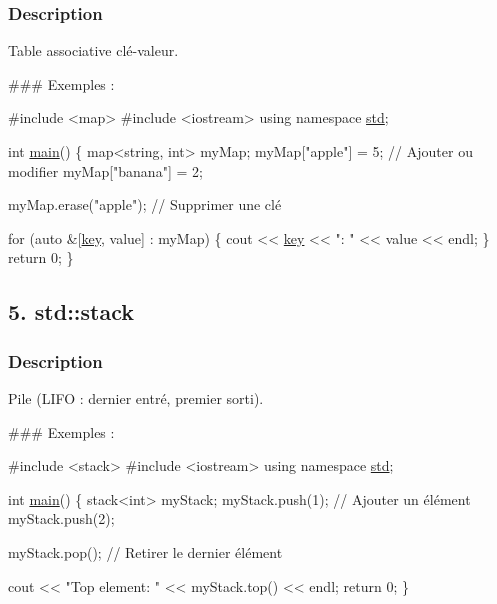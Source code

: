 \subsubsection*{Description}

Table associative clé-\/valeur.

\#\#\# Exemples \+: 
\begin{DoxyCode}
\textcolor{preprocessor}{#include <map>}
\textcolor{preprocessor}{#include <iostream>}
\textcolor{keyword}{using namespace }\hyperlink{namespacestd}{std};

\textcolor{keywordtype}{int} \hyperlink{htop_8c_a3c04138a5bfe5d72780bb7e82a18e627}{main}() \{
    map<string, int> myMap;
    myMap[\textcolor{stringliteral}{"apple"}] = 5; \textcolor{comment}{// Ajouter ou modifier}
    myMap[\textcolor{stringliteral}{"banana"}] = 2;

    myMap.erase(\textcolor{stringliteral}{"apple"}); \textcolor{comment}{// Supprimer une clé}

    \textcolor{keywordflow}{for} (\textcolor{keyword}{auto} &[\hyperlink{Action_8c_acd3d88da3c0e0313c3645ff34f62f542}{key}, value] : myMap) \{
        cout << \hyperlink{Action_8c_acd3d88da3c0e0313c3645ff34f62f542}{key} << \textcolor{stringliteral}{": "} << value << endl;
    \}
    \textcolor{keywordflow}{return} 0;
\}
\end{DoxyCode}




\subsection*{5. std\+::stack}

\subsubsection*{Description}

Pile (L\+I\+FO \+: dernier entré, premier sorti).

\#\#\# Exemples \+: 
\begin{DoxyCode}
\textcolor{preprocessor}{#include <stack>}
\textcolor{preprocessor}{#include <iostream>}
\textcolor{keyword}{using namespace }\hyperlink{namespacestd}{std};

\textcolor{keywordtype}{int} \hyperlink{htop_8c_a3c04138a5bfe5d72780bb7e82a18e627}{main}() \{
    stack<int> myStack;
    myStack.push(1); \textcolor{comment}{// Ajouter un élément}
    myStack.push(2);

    myStack.pop(); \textcolor{comment}{// Retirer le dernier élément}

    cout << \textcolor{stringliteral}{"Top element: "} << myStack.top() << endl;
    \textcolor{keywordflow}{return} 0;
\}
\end{DoxyCode}




